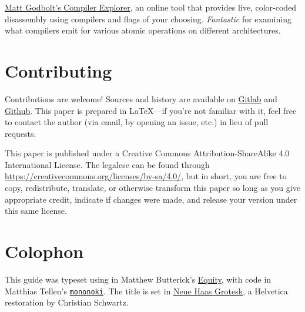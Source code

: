 \documentclass[fontsize=\bodyfontsize, numbers=endperiod]{scrartcl}
\begin{document}
\begin{adjustwidth}{1in}{1in}
\href{https://godbolt.org/}{Matt Godbolt's Compiler Explorer},
an online tool that provides live, color-coded disassembly using compilers and
flags of your choosing.
\emph{Fantastic} for examining what compilers emit for various
atomic operations on different architectures.

\section{Contributing}

Contributions are welcome!
Sources and history are available on
\href{https://gitlab.com/mrkline/concurrency-primer}{Gitlab}
and
\href{https://github.com/mrkline/concurrency-primer}{Github}.
This paper is prepared in \LaTeX{}---if you're not familiar with it,
feel free to contact the author
(via email, by opening an issue, etc.)
in lieu of pull requests.

This paper is published under a
Creative Commons Attribution-ShareAlike 4.0 International License.
The legalese can be found through
\url{https://creativecommons.org/licenses/by-sa/4.0/},
but in short,
you are free to copy, redistribute, translate, or otherwise transform this paper
so long as you give appropriate credit, indicate if changes were made,
and release your version under this same license.

\section{Colophon}

This guide was typeset using \LuaLaTeX{}
in Matthew Butterick's
\href{https://typographyforlawyers.com/equity.html}{Equity},
with code in Matthias Tellen's
\href{https://madmalik.github.io/mononoki/}{\texttt{mononoki}}.
The title is set in
\href{http://www.fontbureau.com/NHG/}{\textsf{\small Neue Haas Grotesk}},
a Helvetica restoration by Christian Schwartz.
\ifebook
\else
\end{adjustwidth}
\fi
\end{document}
